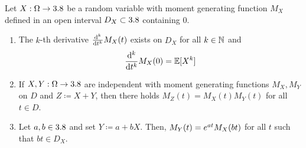 
\begin{lemma}\label{lem:mgf-properties}
Let $X : \Omega \to 3.8$ be a random variable with moment generating function $M_X$ defined in an open interval $D_X \subset 3.8$ containing $0$.
\begin{enumerate}[label=(\roman*)]
\item \label{item:mgf-properties-derivatives}
The $k$-th derivative $\frac{\mathrm{d}^k}{\mathrm{d} t^k}M_X(t)$ exists on $D_X$ for all $k \in \mathbb{N}$ and
\begin{equation}\label{eq:mgf-moments}
\frac{\mathrm{d}^k}{\mathrm{d} t^k}M_X(0)
=
\operatorname{\mathbb{E}}[X^k]
\end{equation}
\item \label{item:mgf-properties-sum}
If $X,Y : \Omega \to 3.8$ are independent with moment generating functions $M_X,M_Y$ on $D$ and $Z \allowbreak \coloneq \allowbreak X \allowbreak + \allowbreak Y$, then there holds $M_Z(t)=M_X(t)M_Y(t)$ for all $t \in D$.
\item \label{item:mgf-properties-affine}
Let $a,b \in 3.8$ and set $Y \coloneq a+bX$.
Then, %
\(
M_Y(t)
=
e^{at}M_X(bt)
\)
for all $t$ such that $bt \in D_X$.
\qedhere
\end{enumerate}
\end{lemma}
